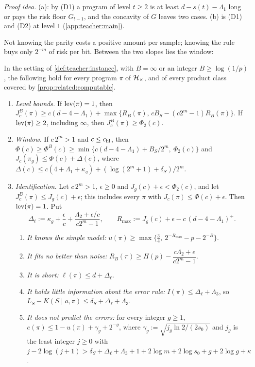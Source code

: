 \emph{Proof idea.} (a): by (D1) a program of level $t\ge2$ is at least $d-s(t)-\Lambda_1$ long or pays the risk floor $G_{t-1}$, and the concavity of $G$ leaves two cases. (b) is (D1) and (D2) at level $1$ (\cref{app:teacher:main}).

Not knowing the parity costs a positive amount per sample; knowing the rule buys only $2^{-m}$ of risk per bit. Between the two slopes lies the window:

\begin{theorem}\label{thm:teacher:main}
In the setting of \cref{def:teacher:instance}, with $B=\infty$ or an integer $B\ge\log(1/p)$, the following hold for every program $\pi$ of $\mathcal{H}_{\times}$, and of every product class covered by \cref{prop:related:computable}.
\begin{enumerate}[label=(\roman*),start=1,itemsep=1pt,topsep=2pt]
\item[(o)] \emph{Level bounds.} If $\operatorname{lev}(\pi)=1$, then $J^B_c(\pi)\ge c(d-4-\Lambda_1)+\max\{R_B(\pi),\,cB_S-(c2^m-1)R_B(\pi)\}$. If $\operatorname{lev}(\pi)\ge2$, including $\infty$, then $J^B_c(\pi)\ge\Phi_2(c)$.
\item \emph{Window.} If $c\,2^m>1$ and $c\le c_{\rm hi}$, then $\Phi(c)\ge\Phi^B(c)\ge\min\{c(d-4-\Lambda_1)+B_S/2^m,\ \Phi_2(c)\}$ and $J_c(\pi_g)\le\Phi(c)+\Delta(c)$, where $\Delta(c)\le c(4+\Lambda_1+\kappa_g)+(\log(2^m+1)+\delta_S)/2^m$.
\item \emph{Identification.} Let $c\,2^m>1$, $\epsilon\ge0$ and $J_g(c)+\epsilon<\Phi_2(c)$, and let $J^B_c(\pi)\le J_g(c)+\epsilon$; this includes every $\pi$ with $J_c(\pi)\le\Phi(c)+\epsilon$. Then $\operatorname{lev}(\pi)=1$. Put
\[
\Delta_\ell:=\kappa_g+\frac\epsilon c+\frac{\Lambda_2+\epsilon/c}{c2^m-1},\qquad R_{\max}:=J_g(c)+\epsilon-c\,(d-4-\Lambda_1)^+.
\]
\begin{enumerate}[label=(\alph*),itemsep=0pt,topsep=1pt]
\item \emph{It knows the simple model:} $u(\pi)\ge\max\{\frac34,\ 2^{-R_{\max}}-p-2^{-B}\}$.
\item \emph{It fits no better than noise:} $R_B(\pi)\ge H(p)-\dfrac{c\Lambda_2+\epsilon}{c2^m-1}$.
\item \emph{It is short:} $\ell(\pi)\le d+\Delta_\ell$.
\item \emph{It holds little information about the error rule:} $I(\pi)\le\Delta_\ell+\Lambda_3$, so $L_S-K(S\mid a,\pi)\le\delta_S+\Delta_\ell+\Lambda_3$.
\item \emph{It does not predict the errors:} for every integer $g\ge1$, $e(\pi)\le1-u(\pi)+\gamma_g+2^{-g}$, where $\gamma_g:=\sqrt{j_g\ln2/(2s_0)}$ and $j_g$ is the least integer $j\ge0$ with $j-2\log(j+1)>\delta_S+\Delta_\ell+\Lambda_3+1+2\log m+2\log s_0+g+2\log g+\kappa$.

\end{enumerate}
\end{enumerate}
\end{theorem}
